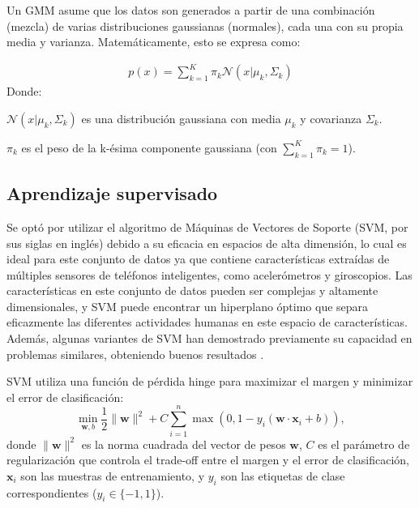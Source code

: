\documentclass{esannV2}
\begin{document}
Un GMM asume que los datos son generados a partir de una combinación (mezcla) de varias distribuciones gaussianas (normales), cada una con su propia media y varianza. Matemáticamente, esto se expresa como:

\begin{eqnarray}
p(x) = \sum_{k=1}^{K} \pi_{k} \mathcal{N}(x | \mu_{k}, \Sigma_{k})
\end{eqnarray}
Donde:

$\mathcal{N}(x | \mu_{k}, \Sigma_{k})$ es una distribución gaussiana con media $\mu_{k}$ y covarianza $\Sigma_{k}$.


$\pi_{k}$ es el peso de la k-ésima componente gaussiana (con $\sum_{k=1}^{K} \pi_{k} = 1$).


\subsection{Aprendizaje supervisado}
Se optó por utilizar el algoritmo de Máquinas de Vectores de Soporte (SVM, por sus siglas en inglés) debido a su eficacia en espacios de alta dimensión, lo cual es ideal para este conjunto de datos ya que contiene características extraídas de múltiples sensores de teléfonos inteligentes, como acelerómetros y giroscopios. Las características en este conjunto de datos pueden ser complejas y altamente dimensionales, y SVM puede encontrar un hiperplano óptimo que separa eficazmente las diferentes actividades humanas en este espacio de características. Además, algunas variantes de SVM han demostrado previamente su capacidad en problemas similares, obteniendo buenos resultados \cite{anguitaSVM}.

SVM utiliza una función de pérdida hinge para maximizar el margen y minimizar el error de clasificación:
\[
\min_{\mathbf{w}, b} \frac{1}{2} \| \mathbf{w} \|^2 + C \sum_{i=1}^n \max(0, 1 - y_i (\mathbf{w} \cdot \mathbf{x}_i + b)),
\]
donde \( \| \mathbf{w} \|^2 \) es la norma cuadrada del vector de pesos \( \mathbf{w} \), \( C \) es el parámetro de regularización que controla el trade-off entre el margen y el error de clasificación, \( \mathbf{x}_i \) son las muestras de entrenamiento, y \( y_i \) son las etiquetas de clase correspondientes (\( y_i \in \{-1, 1\} \)).
\end{document}
